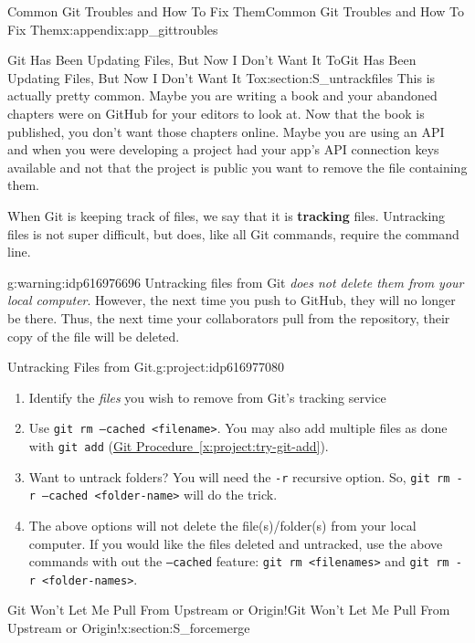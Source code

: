 \documentclass[oneside,10pt,]{book}
\newcommand{\xreffont}{\relax}
\newcommand{\mono}[1]{\texttt{#1}}
\newcommand{\terminology}[1]{\textbf{#1}}
\begin{document}
\begin{appendixptx}{Common Git Troubles and How To Fix Them}{}{Common Git Troubles and How To Fix Them}{}{}{x:appendix:app_gittroubles}
\begin{sectionptx}{Git Has Been Updating Files, But Now I Don't Want It To}{}{Git Has Been Updating Files, But Now I Don't Want It To}{}{}{x:section:S_untrackfiles}
%
%
This is actually pretty common. Maybe you are writing a book and your abandoned chapters were on GitHub for your editors to look at. Now that the book is published, you don't want those chapters online. Maybe you are using an API and when you were developing a project had your app's API connection keys available and not that the project is public you want to remove the file containing them.%
\par
When Git is keeping track of files, we say that it is \terminology{tracking} files. Untracking files is not super difficult, but does, like all Git commands, require the command line.%
\begin{warning}{}{g:warning:idp616976696}%
Untracking files from Git \emph{does not delete them from your local computer}. However, the next time you push to GitHub, they will no longer be there. Thus, the next time your collaborators pull from the repository, their copy of the file will be deleted.%
\end{warning}
\begin{project}{Untracking Files from Git.}{g:project:idp616977080}%
\begin{enumerate}[font=\bfseries,label=(\alph*),ref=\alph*]
\item{}Identify the \emph{files} you wish to remove from Git's tracking service%
\item{}Use \mono{git rm --cached <filename>}. You may also add multiple files as done with \mono{git add} (\hyperref[x:project:try-git-add]{Git Procedure~{\xreffont\ref{x:project:try-git-add}}}).%
\item{}Want to untrack folders? You will need the \mono{-r} recursive option. So, \mono{git rm -r --cached <folder-name>} will do the trick.%
\item{}The above options will not delete the file(s)\slash{}folder(s) from your local computer. If you would like the files deleted and untracked, use the above commands with out the \mono{--cached} feature: \mono{git rm <filenames>} and \mono{git rm -r <folder-names>}.%
\end{enumerate}
\end{project}%
\end{sectionptx}
%
%
\typeout{************************************************}
\typeout{************************************************}
%
\begin{sectionptx}{Git Won't Let Me Pull From Upstream or Origin!}{}{Git Won't Let Me Pull From Upstream or Origin!}{}{}{x:section:S_forcemerge}

\end{sectionptx}
\end{appendixptx}
\end{document}
